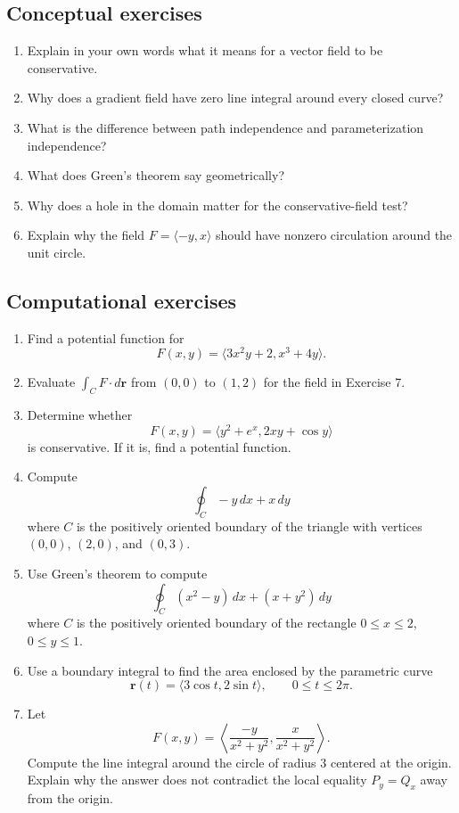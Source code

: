 \documentclass[11pt,oneside]{book}
\newcommand{\vect}[1]{\mathbf{#1}}
\begin{document}
\subsection*{Conceptual exercises}
\begin{enumerate}
  \item Explain in your own words what it means for a vector field to be conservative.
  \item Why does a gradient field have zero line integral around every closed curve?
  \item What is the difference between path independence and parameterization independence?
  \item What does Green's theorem say geometrically?
  \item Why does a hole in the domain matter for the conservative-field test?
  \item Explain why the field $F=\langle -y,x\rangle$ should have nonzero circulation around the unit circle.
\end{enumerate}

\subsection*{Computational exercises}
\begin{enumerate}[start=7]
  \item Find a potential function for
  \[
  F(x,y)=\langle 3x^2y+2, x^3+4y\rangle.
  \]
  \item Evaluate $\int_C F\cdot d\vect r$ from $(0,0)$ to $(1,2)$ for the field in Exercise 7.
  \item Determine whether
  \[
  F(x,y)=\langle y^2+e^x,2xy+\cos y\rangle
  \]
  is conservative. If it is, find a potential function.
  \item Compute
  \[
  \oint_C -y\,dx+x\,dy
  \]
  where $C$ is the positively oriented boundary of the triangle with vertices $(0,0)$, $(2,0)$, and $(0,3)$.
  \item Use Green's theorem to compute
  \[
  \oint_C (x^2-y)\,dx+(x+y^2)\,dy
  \]
  where $C$ is the positively oriented boundary of the rectangle $0\le x\le 2$, $0\le y\le 1$.
  \item Use a boundary integral to find the area enclosed by the parametric curve
  \[
  \vect r(t)=\langle 3\cos t,2\sin t\rangle,\qquad 0\le t\le 2\pi.
  \]
  \item Let
  \[
  F(x,y)=\left\langle \frac{-y}{x^2+y^2},\frac{x}{x^2+y^2}\right\rangle.
  \]
  Compute the line integral around the circle of radius $3$ centered at the origin. Explain why the answer does not contradict the local equality $P_y=Q_x$ away from the origin.
\end{enumerate}
\end{document}
